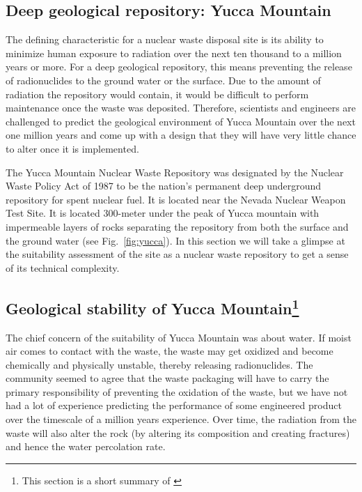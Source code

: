 \documentclass[nofootinbib,preprint,aps]{revtex4-1}
\begin{document}
    \subsection{Deep geological repository: Yucca Mountain}
        The defining characteristic for a nuclear waste disposal site is its ability to minimize human
        exposure to radiation over the next ten thousand to a million years or more.
        For a deep geological repository, this means preventing the release
        of radionuclides to the ground water or the surface.
        Due to the amount of radiation the repository would contain, it would be difficult to perform
        maintenance once the waste was deposited. Therefore, scientists and engineers are challenged
        to predict the geological environment of Yucca Mountain over the next one million years and come up
        with a design that they will have very little chance to alter once it is implemented.

        The Yucca Mountain Nuclear Waste Repository was designated by the Nuclear Waste Policy Act
        of 1987 to be the nation's permanent deep underground repository for spent nuclear fuel. It is
        located near the Nevada Nuclear Weapon Test Site.
        It is located 300-meter under the peak of Yucca mountain with impermeable layers of rocks
        separating the repository
        from both the surface and the ground water (see Fig.~\ref{fig:yucca}).
        In this section we will take a glimpse at the suitability assessment of the site
        as a nuclear waste repository to get a sense of its technical complexity.


        \subsection{Geological stability of Yucca Mountain\footnote{This section is a short summary of \cite{m06}}}
        The chief concern of the suitability of Yucca Mountain was about water. If moist air comes to
        contact with the waste, the waste may get oxidized and become chemically and physically unstable, thereby
        releasing radionuclides.
        The community seemed to agree that the waste packaging will have to carry the primary
        responsibility of preventing the oxidation of the waste, but we have not had a lot of experience
        predicting the performance of some
        engineered product over the timescale of a million years
        experience. Over time, the radiation from the waste will also alter the rock (by altering its composition
        and creating fractures) and hence the water percolation rate.
\end{document}
